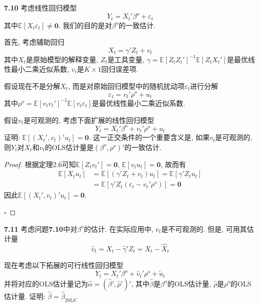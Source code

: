 \documentclass[cn,12pt,math=mtpro2,citestyle=gb7714-2015,bibstyle=gb7714-2015,twocol,mode=simple]{elegantbook}
\newcommand{\E}{\mathbb{E}}
\newcommand{\btls}{\hat{\beta}_{\text{2SLS}}}
\begin{document}
 \textbf{7.10} 考虑线性回归模型
 $$Y_t=X_t'\beta^o+\varepsilon_t$$
 其中$\E[X_t\varepsilon_t]\neq\mathbf{0}$. 我们的目的是对$\beta^o$的一致估计.

 首先, 考虑辅助回归
 $$X_t=\gamma'Z_t+v_t$$
 其中$X_t$是原始模型的解释变量, $Z_t$是工具变量, $\gamma=\E[Z_tZ_t']^{-1}\E[Z_tX_t']$是最优线性最小二乘近似系数, $v_t$是$K\times  1$回归误差项.

 假设现在不是分解$X_t$, 而是对原始回归模型中的随机扰动项$\varepsilon_t$进行分解
 $$\varepsilon_t=v_t'\rho^o+u_t$$
 其中$\rho^o=\E[v_tv_t']^{-1}\E[v_t\varepsilon_t]$是最优线性最小二乘近似系数.

 假设$v_t$是可观测的, 考虑下面扩展的线性回归模型
 $$Y_t=X_t'\beta^o+v_t'\rho^o+u_t$$
 证明: $\E[(X_t',v_t)'u_t]=\mathbf{0}$. 这一正交条件的一个重要含义是, 如果$v_t$是可观测的, 则$Y_t$对$X_t$和$v_t$的OLS估计量是$(\beta^o,\rho^o)'$的一致估计.

\begin{proof}
  根据定理2.6可知$\E[Z_tv_t']=\mathbf{0}$, $\E[v_tu_t]=\mathbf{0}$, 故而有
  \begin{align*}
  \E[X_tu_t]&=\E[(\gamma{'}Z_t+v_t)u_t]=\E[\gamma{'}Z_tu_t] \\
  &=\E[\gamma{'}Z_t(\varepsilon_t-v_t'\rho^o)]=\mathbf{0}
  \end{align*}
  因此$\E[(X_t',v_t)'u_t]=\mathbf{0}$.

  $\square$
\end{proof}

\textbf{7.11} 考虑问题\textbf{7.10}中对$\beta^o$的估计. 在实际应用中, $v_t$是不可观测的. 但是, 可用其估计量
$$\hat{v}_t=X_t-\hat{\gamma}'Z_t=X_t-\hat{X}_t$$

现在考虑以下拓展的可行线性回归模型
$$Y_t=X_t'\beta^o+\hat{v}_t'\rho^o+\tilde{u}_t$$
并将对应的OLS估计量记为$\hat{\alpha}=(\hat{\beta}',\hat{\rho}')'$, 其中$\hat{\beta}$是$\beta^o$的OLS估计量, $\hat{\rho}$是$\rho^o$的OLS估计量. 证明: $\hat{\beta}=\btls$.
\end{document}
